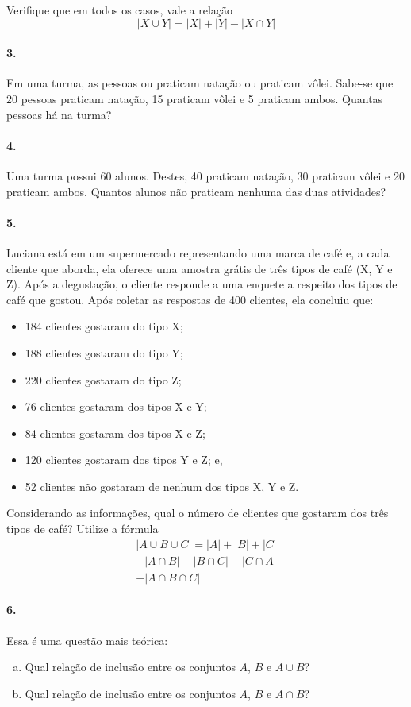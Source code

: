 \documentclass[a4paper,twocolumn,12pt]{article}
\begin{document}
Verifique que em todos os casos, vale a relação
\[|X\cup Y| = |X| + |Y| - |X\cap Y|\]


\paragraph{3.} Em uma turma, as pessoas ou praticam natação ou praticam vôlei. Sabe-se que 20 pessoas praticam natação, 15 praticam vôlei e 5 praticam ambos. Quantas pessoas há na turma?


\paragraph{4.} Uma turma possui 60 alunos. Destes, 40 praticam natação, 30 praticam vôlei e 20 praticam ambos. Quantos alunos não praticam nenhuma das duas atividades?

\paragraph{5.} Luciana está em um supermercado representando uma marca de café e, a cada cliente que aborda, ela oferece uma amostra grátis de três tipos de café (X, Y e Z). Após a degustação, o cliente responde a uma enquete a respeito dos tipos de café que gostou. Após coletar as respostas de 400 clientes, ela concluiu que:
\begin{itemize}
  \setlength{\itemsep}{1pt}
  \setlength{\itemindent}{1pt}
  \item 184 clientes gostaram do tipo X;
  \item 188 clientes gostaram do tipo Y;
  \item 220 clientes gostaram do tipo Z;
  \item 76 clientes gostaram dos tipos X e Y;
  \item 84 clientes gostaram dos tipos X e Z;
  \item 120 clientes gostaram dos tipos Y e Z; e,
  \item 52 clientes não gostaram de nenhum dos tipos X, Y e Z.
\end{itemize}
Considerando as informações, qual o número de clientes que gostaram dos três tipos de café? Utilize a fórmula 
\begin{multline*}
|A\cup B\cup C| = |A| + |B| + |C| \\ - |A\cap B| - |B\cap C| - |C\cap A| \\ + |A\cap B \cap C|
\end{multline*} 


\paragraph{6.} Essa é uma questão mais teórica: 
\begin{enumerate}[a)] 
\item Qual relação de inclusão entre os conjuntos \(A\), \(B\) e \(A\cup B\)?
\item Qual relação de inclusão entre os conjuntos \(A\), \(B\) e \(A\cap B\)?
\end{enumerate}
\end{document}
